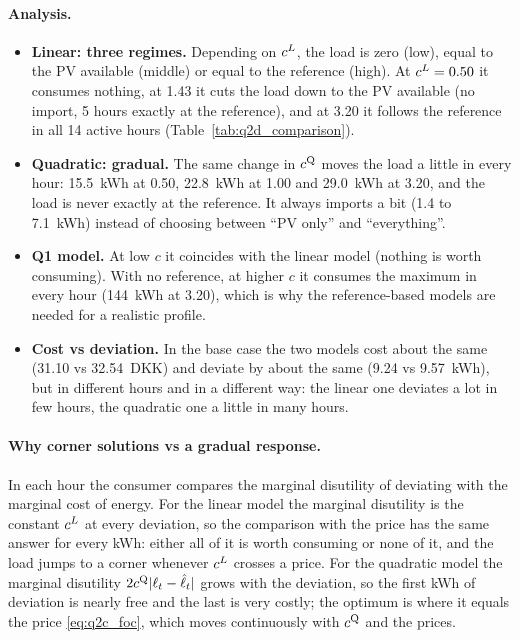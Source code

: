 \paragraph{Analysis.}
\begin{itemize}
    \item \textbf{Linear: three regimes.} Depending on $c^{L}$, the load is zero (low), equal to the PV available (middle) or equal to the reference (high). At $c^{L} = 0.50$ it consumes nothing, at 1.43 it cuts the load down to the PV available (no import, 5 hours exactly at the reference), and at 3.20 it follows the reference in all 14 active hours (Table~\ref{tab:q2d_comparison}).
    \item \textbf{Quadratic: gradual.} The same change in $c^{\mathrm{Q}}$ moves the load a little in every hour: 15.5~kWh at 0.50, 22.8~kWh at 1.00 and 29.0~kWh at 3.20, and the load is never exactly at the reference. It always imports a bit (1.4 to 7.1~kWh) instead of choosing between ``PV only'' and ``everything''.
    \item \textbf{Q1 model.} At low $c$ it coincides with the linear model (nothing is worth consuming). With no reference, at higher $c$ it consumes the maximum in every hour (144~kWh at 3.20), which is why the reference-based models are needed for a realistic profile.
    \item \textbf{Cost vs deviation.} In the base case the two models cost about the same (31.10 vs 32.54~DKK) and deviate by about the same (9.24 vs 9.57~kWh), but in different hours and in a different way: the linear one deviates a lot in few hours, the quadratic one a little in many hours.
\end{itemize}

\paragraph{Why corner solutions vs a gradual response.} In each hour the consumer compares the marginal disutility of deviating with the marginal cost of energy. For the linear model the marginal disutility is the constant $c^{L}$ at every deviation, so the comparison with the price has the same answer for every kWh: either all of it is worth consuming or none of it, and the
load jumps to a corner whenever $c^{L}$ crosses a price. For the quadratic model the marginal disutility $2c^{\mathrm{Q}}|\ell_{t} - \hat{\ell}_{t}|$ grows with the deviation, so the first kWh of deviation is
nearly free and the last is very costly; the optimum is where it equals the price \eqref{eq:q2c_foc}, which moves continuously with $c^{\mathrm{Q}}$ and the prices.

